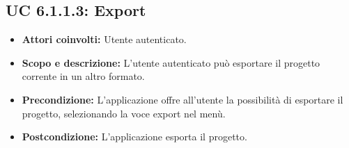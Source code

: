 \subsection{UC 6.1.1.3: Export}
\begin{itemize}
		\item \textbf{Attori coinvolti:} Utente autenticato. \\
		\item \textbf{Scopo e descrizione:} L'utente autenticato può esportare il progetto corrente in un altro formato. \\
		\item \textbf{Precondizione:} L'applicazione offre all'utente la possibilità di esportare il progetto, selezionando la voce export nel menù. \\
		\item \textbf{Postcondizione:} L'applicazione esporta il progetto. \\
\end{itemize}
